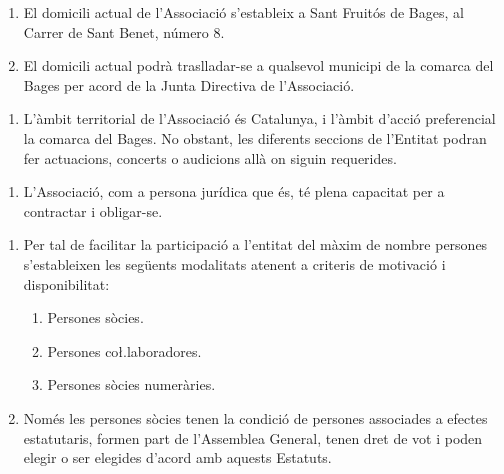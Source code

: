 \documentclass[11pt,a4paper]{article}
\newcommand{\UMB}{Unió Musical del Bages\xspace}
\newcommand{\JD}{Junta Directiva\xspace}
\newcommand{\AG}{Assemblea General\xspace}
\begin{document}

\begin{enumerate}
    \item El domicili actual de l'Associació s'estableix a Sant Fruitós de Bages, al Carrer de Sant Benet, número 8.
    \item El domicili actual podrà traslladar-se a qualsevol municipi de la comarca del Bages per acord de la \JD de l'Associació.
\end{enumerate}


\begin{enumerate}
    \item[] L'àmbit territorial de l'Associació és Catalunya, i l'àmbit d'acció preferencial la comarca del Bages. No obstant, les diferents seccions de l'Entitat podran fer actuacions, concerts o audicions allà on siguin requerides.
\end{enumerate}


\begin{enumerate}
    \item[] L'Associació, com a persona jurídica que és, té plena capacitat per a contractar i obligar-se.
\end{enumerate}




\begin{enumerate}
    \item Per tal de facilitar la participació a l'entitat del màxim de nombre persones s'estableixen les següents modalitats atenent a criteris de motivació i disponibilitat:
    \begin{enumerate}
        \item Persones sòcies.
        \item Persones co\l.laboradores.
        \item Persones sòcies numeràries.
    \end{enumerate}
    \item Només les persones sòcies tenen la condició de persones associades a efectes estatutaris, formen part de l'\AG, tenen dret de vot i poden elegir o ser elegides d'acord amb aquests Estatuts.

\end{enumerate}
\end{document}
